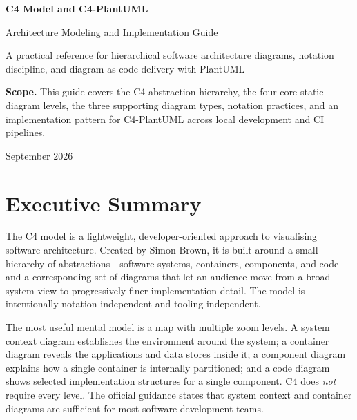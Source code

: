 \documentclass[11pt]{article}
\begin{document}
\hypersetup{pageanchor=false}%
\begin{titlepage}
\centering
\vspace*{1.2in}
{\Huge\bfseries\color{Navy} C4 Model and C4-PlantUML\par}
\vspace{0.25in}
{\LARGE\color{Blue} Architecture Modeling and Implementation Guide\par}
\vspace{0.45in}
{\large A practical reference for hierarchical software architecture diagrams, notation discipline, and diagram-as-code delivery with PlantUML\par}
\vfill
\begin{tcolorbox}[colback=Ice,colframe=Rule,boxrule=0.6pt,width=0.88\textwidth,arc=2mm]
\small
\textbf{Scope.} This guide covers the C4 abstraction hierarchy, the four core static diagram levels, the three supporting diagram types, notation practices, and an implementation pattern for C4-PlantUML across local development and CI pipelines.
\end{tcolorbox}
\vfill
{\large September 2026\par}
\end{titlepage}\hypersetup{pageanchor=true}

\tableofcontents
\newpage

\section{Executive Summary}

The C4 model is a lightweight, developer-oriented approach to visualising software architecture. Created by Simon Brown, it is built around a small hierarchy of abstractions---software systems, containers, components, and code---and a corresponding set of diagrams that let an audience move from a broad system view to progressively finer implementation detail. The model is intentionally notation-independent and tooling-independent.\cite{c4home,c4intro}

The most useful mental model is a map with multiple zoom levels. A system context diagram establishes the environment around the system; a container diagram reveals the applications and data stores inside it; a component diagram explains how a single container is internally partitioned; and a code diagram shows selected implementation structures for a single component. C4 does \emph{not} require every level. The official guidance states that system context and container diagrams are sufficient for most software development teams.\cite{c4diagrams}
\end{document}
